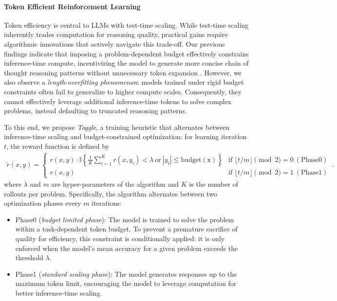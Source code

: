\documentclass{article}
\newcommand{\citep}[1]{\parencite{#1}}
\begin{document}
\paragraph{Token Efficient Reinforcement Learning}
\label{sec:te}
Token efficiency is central to LLMs with test-time scaling. 
While test-time scaling inherently trades computation for reasoning quality, practical gains require algorithmic innovations that actively navigate this trade-off. 
Our previous findings indicate that imposing a problem-dependent budget effectively constrains inference-time compute, incentivizing the model to generate more concise chain of thought reasoning patterns without unnecessary token expansion \citep{team2025kimi,team2025kimik2}. 
However, we also observe a \emph{length-overfitting phenomenon}: models trained under rigid budget constraints often fail to generalize to higher compute scales. Consequently, they cannot effectively leverage additional inference-time tokens to solve complex problems, instead defaulting to truncated reasoning patterns.

To this end, we propose \emph{Toggle}, 
a training heuristic that alternates between {inference-time scaling} and {budget-constrained optimization}: 
for learning iteration $t$, 
the reward function is defined by 
\begin{align*}
\tilde{r}(x,y) = 
\begin{cases} 
r(x, y) \cdot \mathbb{I}\left\{ \frac{1}{K} \sum_{i=1}^K r(x, y_i)  < \lambda\ \mathrm{or}\ |y_i| \leq \mathrm{budget(x)} \right\} & \text{if } \lfloor t/m \rfloor \pmod 2 = 0\ (\mathrm{{Phase 0}}) \\
r(x, y) & \text{if } \lfloor t/m \rfloor \pmod 2 = 1\ (\mathrm{{Phase 1}}) 
\end{cases}
\, .
\end{align*}
where $\lambda$ and $m$ are hyper-parameters of the algorithm and $K$ is the number of rollouts per problem. 
Specifically, the algorithm alternates between two optimization phases every $m$ iterations:
\begin{itemize}

\item {Phase0} (\emph{budget limited phase}): 
The model is trained to solve the problem within a task-dependent token budget. 
To prevent a premature sacrifice of quality for efficiency, this constraint is conditionally applied: it is only enforced when the model's mean accuracy for a given problem exceeds the threshold $\lambda$.

\item {Phase1} (\emph{standard scaling phase}): The model generates responses up to the maximum token limit, encouraging the model to leverage computation for better inference-time scaling. 

\end{itemize}
\end{document}
